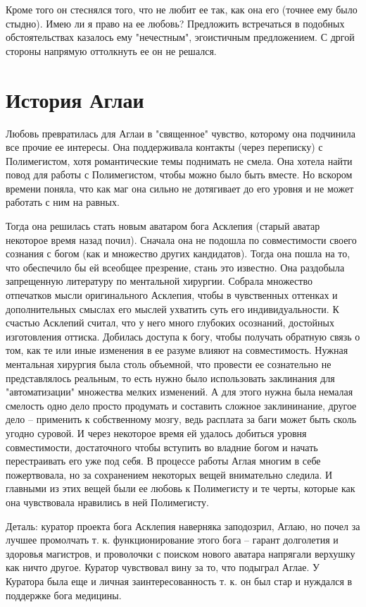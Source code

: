\documentclass[12pt,a4paper]{article}
\begin{document}
Кроме того он стеснялся того, что не любит ее так, как она его (точнее ему было стыдно). Имею ли я право на ее любовь? Предложить встречаться в подобных обстоятельствах казалось ему "нечестным", эгоистичным предложением. С дргой стороны напрямую оттолкнуть ее он не решался.

\section*{История Аглаи}
Любовь превратилась для Аглаи в "священное" чувство, которому она подчинила все прочие ее интересы. Она поддерживала контакты (через переписку) с Полимегистом, хотя романтические темы поднимать не смела.
Она хотела найти повод для работы с Полимегистом, чтобы можно было быть вместе. Но вскором времени поняла, что как маг она сильно не дотягивает до его уровня и не может работать с ним на равных.

Тогда она решилась стать новым аватаром бога Асклепия (старый аватар некоторое время назад почил). Сначала она не подошла по совместимости своего сознания с богом (как и множество других кандидатов). Тогда она пошла на то, что обеспечило бы ей всеобщее презрение, стань это известно. Она раздобыла запрещенную литературу по ментальной хирургии. Собрала множество отпечатков мысли оригинального Асклепия, чтобы в чувственных оттенках и дополнительных смыслах его мыслей ухватить суть его индивидуальности. К счастью Асклепий считал, что у него много глубоких осознаний, достойных изготовления оттиска. Добилась доступа к богу, чтобы получать обратную связь о том, как те или иные изменения в ее разуме влияют на совместимость. Нужная ментальная хирургия была столь объемной, что провести ее сознательно не представлялось реальным, то есть нужно было использовать заклинания для "автоматизации" множества мелких изменений. А для этого нужна была немалая смелость одно дело просто продумать и составить сложное заклининание, другое дело -- применить к собственному мозгу, ведь расплата за баги может быть сколь угодно суровой. И через некоторое время ей удалось добиться уровня совместимости, достаточного чтобы вступить во владние богом и начать перестраивать его уже под себя. В процессе работы Аглая многим в себе пожертвовала, но за сохранением некоторых вещей внимательно следила. И главными из этих вещей были ее любовь к Полимегисту и те черты, которые как она чувствовала нравились в ней Полимегисту.

Деталь: куратор проекта бога Асклепия наверняка заподозрил, Аглаю, но почел за лучшее промолчать т. к. функционирование этого бога -- гарант долголетия и здоровья магистров, и проволочки с поиском нового аватара напрягали верхушку как ничто другое. Куратор чувствовал вину за то, что подыграл Аглае. У Куратора была еще и личная заинтересованность т. к. он был стар и нуждался в поддержке бога медицины.
\end{document}
